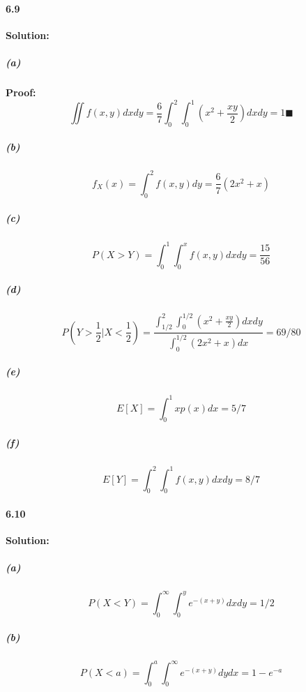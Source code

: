 \documentclass[11pt]{article}
\begin{document}
	\paragraph{6.9}\textbf{Solution:}
		\subparagraph{(a)}\textbf{Proof:}
			\[\iint f(x, y)dxdy = \frac{6}{7} \int_0^2 \int_0^1 (x^2 + \frac{xy}{2}) dxdy = 1\blacksquare\]
		\subparagraph{(b)}
			\[f_X(x) = \int_0^2 f(x, y)dy = \frac{6}{7}(2x^2 + x)\]
		\subparagraph{(c)}
			\[P(X > Y) = \int_0^1 \int_0^x f(x, y)dxdy = \frac{15}{56}\]
		\subparagraph{(d)}
			\[P(Y > \frac{1}{2} | X < \frac{1}{2}) = \frac{\int_{1/2}^2\int_0^{1/2}(x^2+\frac{xy}{2})dxdy}{\int_{0}^{1/2}(2x^2+x)dx} = 69/80\]
		\subparagraph{(e)}
			\[E[X] = \int_0^1 xp(x)dx = 5/7\]
		\subparagraph{(f)}
			\[E[Y] = \int_0^2\int_0^1 f(x, y)dxdy = 8/7\]
	\paragraph{6.10}\textbf{Solution:}
			\subparagraph{(a)}
				\[P(X < Y) = \int_0^{\infty}\int_0^y e^{-(x+y)}dxdy = 1/2\]
			\subparagraph{(b)}
				\[P(X < a) = \int_0^a\int_0^{\infty}e^{-(x+y)}dydx = 1 - e^{-a}\]
\end{document}
